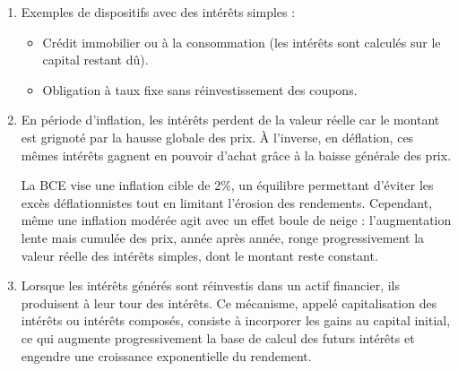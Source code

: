 \documentclass{article}
\begin{document}
\begin{enumerate}[label=\textbf{Q\arabic*.}]
    \item Exemples de dispositifs avec des intérêts simples :
    \begin{itemize}
        \item Crédit immobilier ou à la consommation (les intérêts  sont calculés sur le capital restant dû).
        \item Obligation à taux fixe sans réinvestissement des coupons.
    \end{itemize}

    \item En période d'inflation, les intérêts perdent de la valeur réelle car le montant est grignoté par la hausse globale des prix. À l’inverse, en déflation, ces mêmes intérêts gagnent en pouvoir d’achat grâce à la baisse générale des prix. 

    La BCE vise une inflation cible de \( 2\% \), un équilibre permettant d’éviter les excès déflationnistes tout en limitant l’érosion des rendements. Cependant, même une inflation modérée agit avec un effet boule de neige : l’augmentation lente mais cumulée des prix, année après année, ronge progressivement la valeur réelle des intérêts simples, dont le montant reste constant.

    \item Lorsque les intérêts générés sont réinvestis dans un actif financier, ils produisent à leur tour des intérêts. Ce mécanisme, appelé capitalisation des intérêts ou intérêts composés, consiste à incorporer les gains au capital initial, ce qui augmente progressivement la base de calcul des futurs intérêts et engendre une croissance exponentielle du rendement.
    
\end{enumerate}
\end{document}
